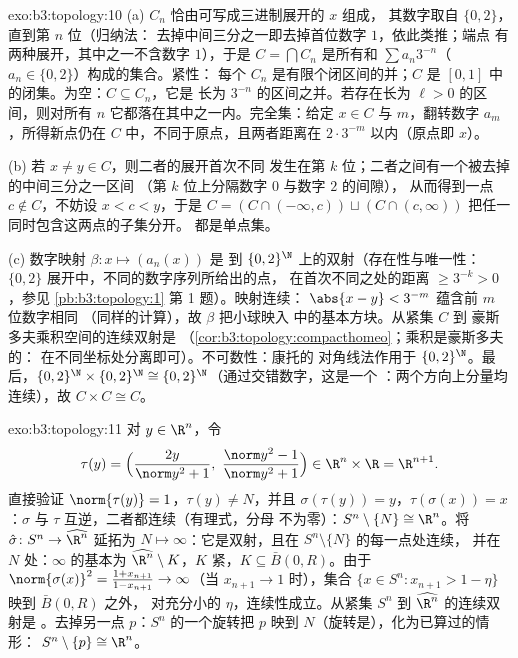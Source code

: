 \begin{solution}{exo:b3:topology:10}
(a) $C_n$ 恰由可写成三进制展开的 $x$ 组成，
其数字取自 $\{0, 2\}$，直到第 $n$ 位（归纳法：
去掉中间三分之一即去掉首位数字 $1$，依此类推；端点
有两种展开，其中之一不含数字 $1$），于是 $C = \bigcap C_n$
是所有和 $\sum a_n3^{-n}$（$a_n \in \{0,2\}$）构成的集合。紧性：
每个 $C_n$ 是有限个闭区间的并；$C$ 是
$[0,1]$ 中的闭集。为空：$C \subseteq C_n$，它是
长为 $3^{-n}$ 的区间之并。若存在长为
$\ell > 0$ 的区间，则对所有 $n$ 它都落在其中之一内。完全集：给定
$x \in C$ 与 $m$，翻转数字 $a_m$，所得新点仍在
$C$ 中，不同于原点，且两者距离在 $2\cdot3^{-m}$ 以内（原点即 $x$）。

(b) 若 $x \neq y \in C$，则二者的展开首次不同
发生在第 $k$ 位；二者之间有一个被去掉的中间三分之一区间
（第 $k$ 位上分隔数字 $0$ 与数字 $2$ 的间隙），
从而得到一点 $c \notin C$，不妨设 $x < c < y$，于是 $C =
(C \cap (-\infty, c)) \sqcup (C \cap (c, \infty))$ 把任一同时包含这两点的子集分开。
都是单点集。

(c) 数字映射 $\beta\colon x \mapsto (a_n(x))$ 是
到 $\{0,2\}^\N$ 上的双射（存在性与唯一性：
$\{0,2\}$ 展开中，不同的数字序列所给出的点，
在首次不同之处的距离 $\geq 3^{-k} > 0$，参见
\cref{pb:b3:topology:1} 第 1 题）。映射连续：
$\abs{x - y} < 3^{-m}$ 蕴含前 $m$ 位数字相同
（同样的计算），故 $\beta$ 把小球映入
中的基本方块。从紧集 $C$ 到
豪斯多夫乘积空间的连续双射是
（\cref{cor:b3:topology:compacthomeo}；乘积是豪斯多夫的：
在不同坐标处分离即可）。不可数性：康托的
对角线法作用于 $\{0,2\}^\N$。最后，$\{0,2\}^\N \times
\{0,2\}^\N \cong \{0,2\}^\N$（通过交错数字，这是一个
：两个方向上分量均连续），故 $C
\times C \cong C$。
\end{solution}

\begin{solution}{exo:b3:topology:11}
对 $y \in \R^n$，令
\[
\tau(y) = \Bigl(\frac{2y}{\norm y^2 + 1},\ \frac{\norm y^2 -
1}{\norm y^2 + 1}\Bigr) \in \R^n\times\R = \R^{n+1}.
\]
直接验证 $\norm{\tau(y)} = 1$，$\tau(y) \neq N$，并且
$\sigma(\tau(y)) = y$，$\tau(\sigma(x)) = x$：$\sigma$ 与
$\tau$ 互逆，二者都连续（有理式，分母
不为零）：$S^n\setminus\{N\} \cong
\R^n$。将 $\hat\sigma \colon S^n \to \widehat{\R^n}$ 延拓为
$N \mapsto \infty$：它是双射，且在 $S^n\setminus\{N\}$ 的每一点处连续，
并在 $N$ 处：$\infty$ 的基本为
$\widehat{\R^n}\setminus K$，$K$ 紧，$K
\subseteq \bar B(0, R)$。由于 $\norm{\sigma(x)}^2 = \frac{1 +
x_{n+1}}{1 - x_{n+1}} \to \infty$（当 $x_{n+1} \to 1$ 时），集合
$\{x \in S^n : x_{n+1} > 1 - \eta\}$ 映到 $\bar B(0,R)$ 之外，
对充分小的 $\eta$，连续性成立。从紧集
$S^n$ 到 $\widehat{\R^n}$ 的连续双射是
。去掉另一点 $p$：$S^n$ 的一个旋转把
$p$ 映到 $N$（旋转是），化为已算过的情形：
$S^n \setminus \{p\} \cong \R^n$。
\end{solution}

